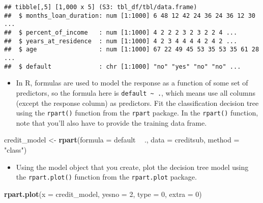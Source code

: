 \documentclass[
]{book}
\newenvironment{Shaded}{\begin{snugshade}}{\end{snugshade}}
\newcommand{\DataTypeTok}[1]{\textcolor[rgb]{0.13,0.29,0.53}{#1}}
\newcommand{\DecValTok}[1]{\textcolor[rgb]{0.00,0.00,0.81}{#1}}
\newcommand{\KeywordTok}[1]{\textcolor[rgb]{0.13,0.29,0.53}{\textbf{#1}}}
\newcommand{\NormalTok}[1]{#1}
\newcommand{\OperatorTok}[1]{\textcolor[rgb]{0.81,0.36,0.00}{\textbf{#1}}}
\newcommand{\StringTok}[1]{\textcolor[rgb]{0.31,0.60,0.02}{#1}}
\providecommand{\tightlist}{%
  \setlength{\itemsep}{0pt}\setlength{\parskip}{0pt}}
\begin{document}
\begin{verbatim}
## tibble[,5] [1,000 x 5] (S3: tbl_df/tbl/data.frame)
##  $ months_loan_duration: num [1:1000] 6 48 12 42 24 36 24 36 12 30 ...
##  $ percent_of_income   : num [1:1000] 4 2 2 2 3 2 3 2 2 4 ...
##  $ years_at_residence  : num [1:1000] 4 2 3 4 4 4 4 2 4 2 ...
##  $ age                 : num [1:1000] 67 22 49 45 53 35 53 35 61 28 ...
##  $ default             : chr [1:1000] "no" "yes" "no" "no" ...
\end{verbatim}

\begin{itemize}
\tightlist
\item
  In R, formulas are used to model the response as a function of some set of predictors, so the formula here is \texttt{default\ \textasciitilde{}\ .}, which means use all columns (except the response column) as predictors. Fit the classification decision tree using the \texttt{rpart()} function from the \texttt{rpart} package. In the \texttt{rpart()} function, note that you'll also have to provide the training data frame.
\end{itemize}

\begin{Shaded}
\begin{Highlighting}[]
\NormalTok{credit_model <-}\StringTok{ }\KeywordTok{rpart}\NormalTok{(}\DataTypeTok{formula =}\NormalTok{ default }\OperatorTok{~}\StringTok{ }\NormalTok{., }
                      \DataTypeTok{data =}\NormalTok{ creditsub, }
                      \DataTypeTok{method =} \StringTok{"class"}\NormalTok{)}
\end{Highlighting}
\end{Shaded}

\begin{itemize}
\tightlist
\item
  Using the model object that you create, plot the decision tree model using the \texttt{rpart.plot()} function from the \texttt{rpart.plot} package.
\end{itemize}

\begin{Shaded}
\begin{Highlighting}[]
\KeywordTok{rpart.plot}\NormalTok{(}\DataTypeTok{x =}\NormalTok{ credit_model, }\DataTypeTok{yesno =} \DecValTok{2}\NormalTok{, }\DataTypeTok{type =} \DecValTok{0}\NormalTok{, }\DataTypeTok{extra =} \DecValTok{0}\NormalTok{)}
\end{Highlighting}
\end{Shaded}
\end{document}

